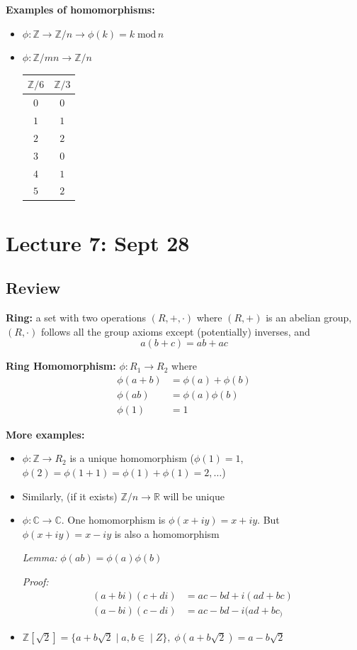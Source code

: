 \documentclass[12pt]{report}
\newcommand{\R}{\mathbb{R}}
\newcommand{\Z}{\mathbb{Z}}
\renewcommand{\mod}{\; \text{mod}\, }
\begin{document}
\textbf{Examples of homomorphisms:}
\begin{itemize}
    \item $\phi: \Z \to \Z/n \longrightarrow \phi(k) = k\mod n$ 
    \item $\phi: \Z/mn \to \Z/n$ 
    \begin{center}
        \begin{tabular*}{0.85in}{|c|c|}
            $\Z/6$ & $\Z/3$\\
            \hline
            $0$ & $0$\\
            $1$ & $1$\\
            $2$ & $2$\\
            $3$ & $0$\\
            $4$ & $1$\\
            $5$ & $2$\\
            \hline
        \end{tabular*}
    \end{center}
\end{itemize}

\section*{Lecture 7: Sept 28}
\subsection*{Review}
\textbf{Ring:} a set with two operations $(R, +, \cdot)$ where $(R, +)$ is an abelian group, $(R, \cdot)$ follows all the group axioms except (potentially) inverses, and 
\[a(b+c) = ab + ac\]

\textbf{Ring Homomorphism:} $\phi: R_1 \to R_2$ where 
\begin{align*}
    \phi(a + b) &= \phi(a) + \phi(b)\\
    \phi(ab) &= \phi(a)\phi(b)\\
    \phi(1) &= 1
\end{align*}

\textbf{More examples:}
\begin{itemize}
    \item $\phi: \Z \to R_2$ is a unique homomorphism ($\phi(1) = 1$, $\phi(2) = \phi(1 + 1) = \phi(1) +\phi(1) = 2, \dots$)
    \item Similarly, (if it exists) $\Z/n \to \R$ will be unique 
    \item $\phi: \mathbb{C} \to \mathbb{C}$. One homomorphism is $\phi(x + iy) = x + iy$. But $\phi(x + iy) = x - iy$ is also a homomorphism
    
    \emph{Lemma:} $\phi(ab) = \phi(a)\phi(b)$

    \emph{Proof:}
    \begin{align*}
        (a+bi)(c+ di) &= ac - bd + i(ad + bc)\\
        (a- bi)(c -di) &= ac - bd - i(ad+bc_)
    \end{align*}

    \item $\Z[\sqrt 2] = \{a + b\sqrt 2 \; | \; a, b\in \; | \;Z\}, \; \phi(a + b\sqrt 2) = a - b\sqrt 2$
\end{itemize}
\end{document}
